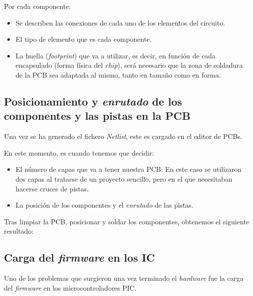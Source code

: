 Por cada componente:

\begin{itemize}
\item
Se describen las conexiones de cada uno de los elementos del circuito.
\item
El tipo de elemento que es cada componente.
\item
La huella (\emph{footprint}) que va a utilizar, es decir, en función de cada encapsulado (forma física del \emph{chip}), será necesario que la zona de soldadura de la PCB sea adaptada al mismo, tanto en tamaño como en forma.
\end{itemize}

\newpage
\subsection{Posicionamiento y \textit{enrutado} de los componentes y las pistas en la PCB}\label{posicionamiento_y_enrutado_de_los_componentes_y_las_pistas_en_la_pcb}

Una vez se ha generado el fichero \emph{Netlist}, este es cargado en el editor de PCBs.

En este momento, es cuando tenemos que decidir:

\begin{itemize}
\item
El número de capas que va a tener nuestra PCB: En este caso se utilizaron dos capas al tratarse de un proyecto sencillo, pero en el que necesitaban hacerse cruces de pistas.
\item
La posición de los componentes y el \textit{enrutado} de las pistas.
\end{itemize}





Tras limpiar la PCB, posicionar y soldar los componentes, obtenemos el siguiente resultado:



\subsection{Carga del \emph{firmware} en los IC}\label{carga_firm_pic}

Uno de los problemas que surgieron una vez terminado el \emph{hardware} fue la carga del \emph{firmware}\cite{firmwarePic} en los microcontroladores PIC.

